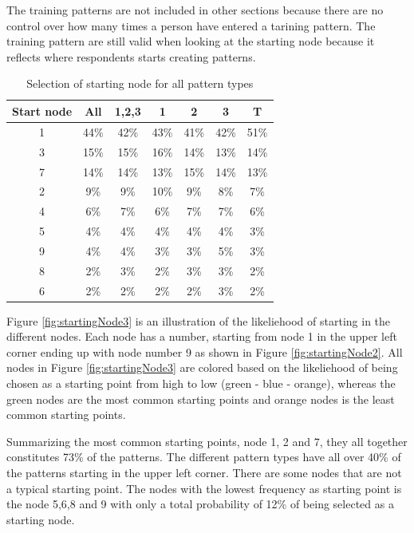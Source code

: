    The training patterns are not included in other sections because there are no control over how many times a person have entered a tarining pattern. The training pattern are still valid when looking at the starting node because it reflects where respondents starts creating patterns. 

    \begin{table}[H]
      \centering
      \begin{tabular}{ c || c | c || c | c | c | c }
        \hline
        {\bf Start node} & All & 1,2,3 & 1 & 2 & 3 & T \\ \hline
        1 & 44\% & 42\% & 43\% & 41\% & 42\% & 51\% \\
        3 & 15\% & 15\% & 16\% & 14\% & 13\% & 14\% \\
        7 & 14\% & 14\% & 13\% & 15\% & 14\% & 13\% \\
        2 & 9\%  & 9\%  & 10\% & 9\%  & 8\%  & 7\%  \\
        4 & 6\%  & 7\%  & 6\%  & 7\%  & 7\%  & 6\%  \\
        5 & 4\%  & 4\%  & 4\%  & 4\%  & 4\%  & 3\%  \\
        9 & 4\%  & 4\%  & 3\%  & 3\%  & 5\%  & 3\%  \\
        8 & 2\%  & 3\%  & 2\%  & 3\%  & 3\%  & 2\%  \\
        6 & 2\%  & 2\%  & 2\%  & 2\%  & 3\%  & 2\%  \\ \hline
      \end{tabular}
      \caption{Selection of starting node for all pattern types}
      \label{tab:startingNode1}
    \end{table}

    Figure \ref{fig:startingNode3} is an illustration of the likeliehood of starting in the different nodes. Each node has a number, starting from node 1 in the upper left corner ending up with node number 9 as shown in Figure \ref{fig:startingNode2}. All nodes in Figure \ref{fig:startingNode3} are colored based on the likeliehood of being chosen as a starting point from high to low (green - blue - orange), whereas the green nodes are the most common starting points and orange nodes is the least common starting points.

    Summarizing the most common starting points, node 1, 2 and 7, they all together constitutes 73\% of the patterns. The different pattern types have all over 40\% of the patterns starting in the upper left corner. There are some nodes that are not a typical starting point. The nodes with the lowest frequency as starting point is the node 5,6,8 and 9 with only a total probability of 12\% of being selected as a starting node.

